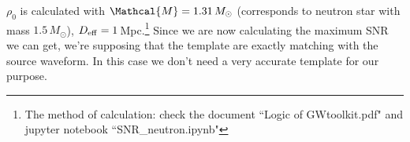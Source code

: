 \documentclass{article}
\begin{document}
$\rho_0$ is calculated with $\Mathcal{M}=1.31\,M_\odot$ (corresponds to neutron star with mass $1.5\,M_\odot$), $D_{\rm{eff}}=1$\,Mpc.\footnote{The method of calculation: check the document ``Logic of GWtoolkit.pdf" and jupyter notebook ``SNR\_neutron.ipynb"} Since we are now calculating the maximum SNR we can get, we're supposing that the template are exactly matching with the source waveform. In this case we don't need a very accurate template for our purpose. 
\end{document}
